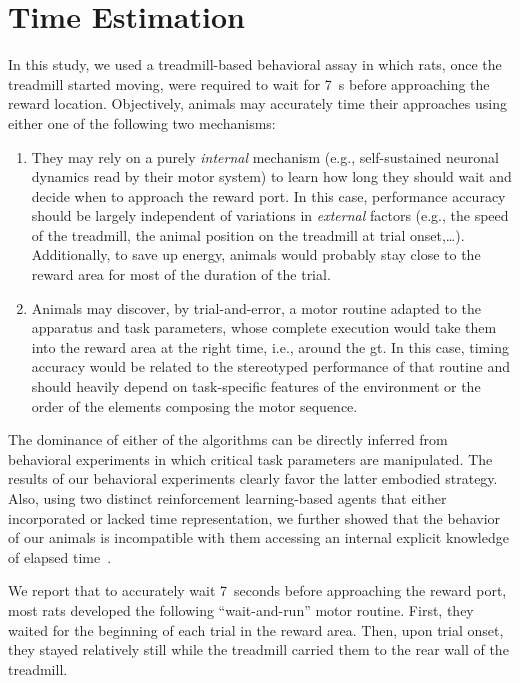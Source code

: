 \section{Time Estimation}
\label{ch:disscusion:time}

In this study, we used a treadmill-based behavioral assay in which rats, once the treadmill started moving, were required to wait for 7~s before approaching the reward location.
Objectively, animals may accurately time their approaches using either one of the following two mechanisms:
\begin{enumerate}[noitemsep, label=\Roman*.]
    \item They may rely on a purely \textit{internal} mechanism (e.g., self-sustained neuronal dynamics read by their motor system) to learn how long they should wait and decide when to approach the reward port.
    In this case, performance accuracy should be largely independent of variations in \textit{external} factors (e.g., the speed of the treadmill, the animal position on the treadmill at trial onset,\ldots).
    Additionally, to save up energy, animals would probably stay close to the reward area for most of the duration of the trial.
    \item Animals may discover, by trial-and-error, a motor routine adapted to the apparatus and task parameters, whose complete execution would take them into the reward area at the right time, i.e., around the \gls{gt}.
    In this case, timing accuracy would be related to the stereotyped performance of that routine and should heavily depend on task-specific features of the environment or the order of the elements composing the motor sequence.
\end{enumerate}
The dominance of either of the algorithms can be directly inferred from behavioral experiments in which critical task parameters are manipulated.
The results of our behavioral experiments clearly favor the latter embodied strategy.
Also, using two distinct reinforcement learning-based agents that either incorporated or lacked time representation, we further showed that the behavior of our animals is incompatible with them accessing an internal explicit knowledge of elapsed time~\cite{Safaie2020PNAS}.
\par
We report that to accurately wait 7~seconds before approaching the reward port, most rats developed the following ``wait-and-run'' motor routine.
First, they waited for the beginning of each trial in the reward area.
Then, upon trial onset, they stayed relatively still while the treadmill carried them to the rear wall of the treadmill.
